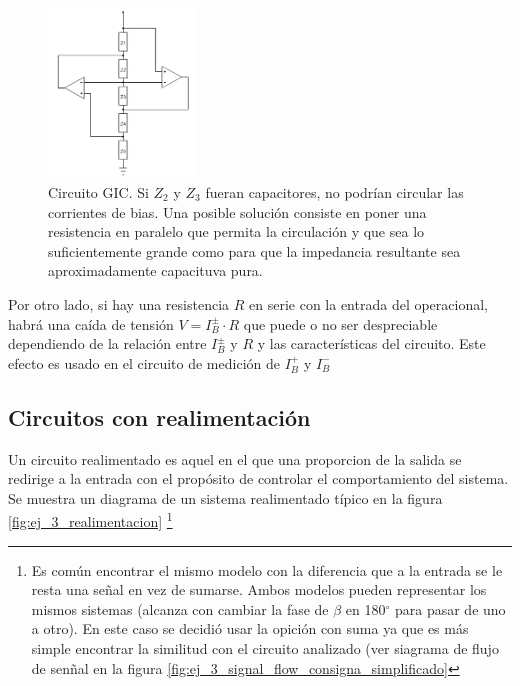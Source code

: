 \documentclass[../../main.tex]{subfiles}
\begin{document}
\begin{figure}[htb] %
	\centering
	\includegraphics[width=0.35\textwidth]{imagenes/gic.png}
	\caption[Capacitores en un GIC]{Circuito GIC. Si $Z_2$ y $Z_3$ fueran capacitores, no podr\'ian circular las corrientes de bias. Una posible soluci\'on consiste en poner una resistencia en paralelo que permita la circulaci\'on y que sea lo suficientemente grande como para que la impedancia resultante sea aproximadamente capacituva pura.}
	\label{fig:ej_3_GIC}
\end{figure}


Por otro lado, si hay una resistencia $R$ en serie con la entrada del operacional, habr\'a una ca\'ida de tensi\'on $V=I_B^\pm\cdot R$ que puede o no ser despreciable dependiendo de la relaci\'on entre $I_B^\pm$ y $R$ y las caracter\'isticas del circuito. Este efecto es usado en el circuito de medici\'on de $I_B^+$ y $I_B^-$








\subsection{Circuitos con realimentaci\'on}	\label{ssec:realimentacion}

Un circuito realimentado es aquel en el que una proporcion de la salida se redirige a la entrada con el prop\'osito de controlar el comportamiento del sistema. Se  muestra un diagrama de un sistema realimentado t\'ipico en la figura \ref{fig:ej_3_realimentacion}
\footnote{Es com\'un encontrar el mismo modelo con la diferencia que a la entrada se le resta una se\~nal en vez de sumarse. Ambos modelos pueden representar los mismos sistemas (alcanza con cambiar la fase de $\beta$ en 180$^\circ$ para pasar de uno a otro). En este caso se decidi\'o usar la opici\'on con suma ya que es m\'as simple encontrar la similitud con el circuito analizado (ver siagrama de flujo de sen\~nal en la figura \ref{fig:ej_3_signal_flow_consigna_simplificado}}
\end{document}
